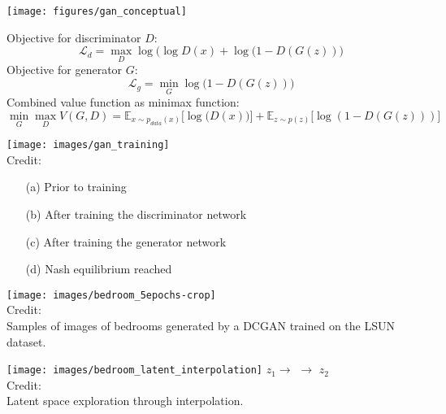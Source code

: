 \documentclass[11pt, a4paper, landscape]{article}
\begin{document}
\NewPage{}
	\begin{center}
		\texttt{[image: figures/gan\_conceptual]}\\
	\end{center}

\NewPage{}
\vfill
	Objective for discriminator $D$:
	\begin{equation}
    \mathcal{L}_d = \max_{D} \log\big(\log D(x) + \log (1 - D(G(z))\big)
	\end{equation}
	Objective for generator $G$:\\
	\begin{equation}
    \mathcal{L}_g = \min_{G} \log\bigg(1 - D(G(z))\bigg)
	\end{equation}
	\vfill
	Combined value function as minimax function:\\
	\begin{equation}
		\min_{G} \max_{D} V(G,D) = \mathbb{E}_{x \sim p_{data}(x)}\big[\log \big(D(x)\big)\big] + \mathbb{E}_{z \sim p(z)}\big[\log (1 - D(G(z)))\big]
	\end{equation}
\vfill

\NewPage{}
\vfill
	\begin{center}
		\texttt{[image: images/gan\_training]}\\

		Credit:
		\vfill
		\begin{itemize}
			\item[(a)] Prior to training
			\item[(b)] After training the discriminator network
			\item[(c)] After training the generator network
			\item[(d)] Nash equilibrium reached
		\end{itemize}
	\end{center}
\vfill


\NewPage{}
	\begin{center}
		\texttt{[image: images/bedroom\_5epochs-crop]}\\
		\vfill
		Credit: \cite{dcgan:2015}\\ Samples of images of bedrooms generated by a DCGAN trained on the
		LSUN dataset.
		\vfill
	\end{center}

\NewPage{}
	\begin{center}
    \vfill
    \centering
		\texttt{[image: images/bedroom\_latent\_interpolation]}
    \vfill
    $z_1$\hfill $\longrightarrow$ \hfill $\longrightarrow$ \hfill $z_2$\\
		\vfill
    \centering
		Credit: \cite{dcgan:2015}\\
		Latent space exploration through interpolation.
		\vfill
	\end{center}
\end{document}
